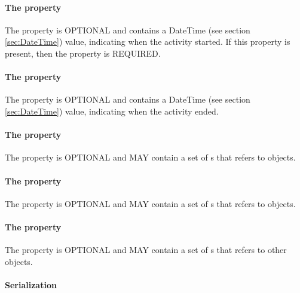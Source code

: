 {\paragraph{The  property}\label{sec:startedAtTime}
The  property is OPTIONAL and contains a DateTime (see section \ref{sec:DateTime}) value, indicating when the activity started.  If this property is present, then the  property is REQUIRED.

\paragraph{The  property}\label{sec:endedAtTime}
The  property is OPTIONAL and contains a DateTime (see section \ref{sec:DateTime}) value, indicating when the activity ended.


\paragraph{The  property}\label{sec:associations}
The  property is OPTIONAL and MAY contain a set of s that refers to  objects.

\paragraph{The  property}\label{sec:usages}
The  property is OPTIONAL and MAY contain a set of s that refers to  objects.

\paragraph{The  property}\label{sec:wasInformedBys}
The  property is OPTIONAL and MAY contain a set of s that refers to other  objects.

\paragraph{Serialization}
}

